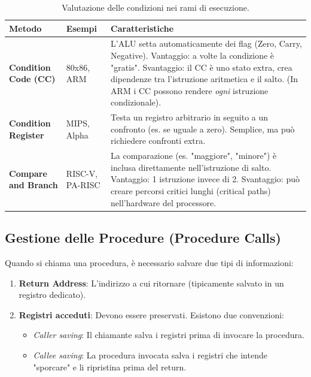 \begin{table}[H]
\centering
\begin{tabular}{|p{3cm}|p{3cm}|p{8cm}|}
\hline
\textbf{Metodo} & \textbf{Esempi} & \textbf{Caratteristiche} \\ \hline
\textbf{Condition Code (CC)} & 80x86, ARM & L'ALU setta automaticamente dei flag (Zero, Carry, Negative). Vantaggio: a volte la condizione è "gratis". Svantaggio: il CC è uno stato extra, crea dipendenze tra l'istruzione aritmetica e il salto. (In ARM i CC possono rendere \textit{ogni} istruzione condizionale). \\ \hline
\textbf{Condition Register} & MIPS, Alpha & Testa un registro arbitrario in seguito a un confronto (es. se uguale a zero). Semplice, ma può richiedere confronti extra. \\ \hline
\textbf{Compare and Branch} & RISC-V, PA-RISC & La comparazione (es. "maggiore", "minore") è inclusa direttamente nell'istruzione di salto. Vantaggio: 1 istruzione invece di 2. Svantaggio: può creare percorsi critici lunghi (critical paths) nell'hardware del processore. \\ \hline
\end{tabular}
\caption{Valutazione delle condizioni nei rami di esecuzione.}
\end{table}

\subsection{Gestione delle Procedure (Procedure Calls)}
Quando si chiama una procedura, è necessario salvare due tipi di informazioni:
\begin{enumerate}
    \item \textbf{Return Address}: L'indirizzo a cui ritornare (tipicamente salvato in un registro dedicato).
    \item \textbf{Registri acceduti}: Devono essere preservati. Esistono due convenzioni:
    \begin{itemize}
        \item \textit{Caller saving}: Il chiamante salva i registri prima di invocare la procedura.
        \item \textit{Callee saving}: La procedura invocata salva i registri che intende "sporcare" e li ripristina prima del return.
    \end{itemize}
\end{enumerate}

